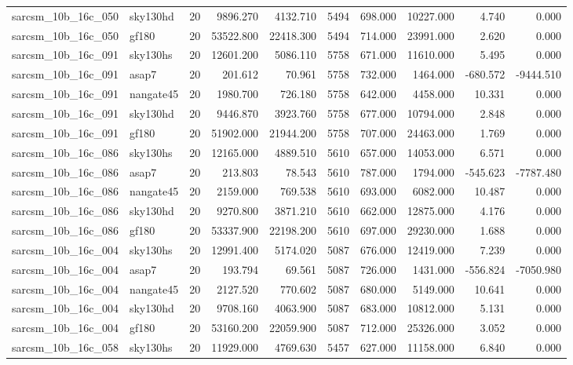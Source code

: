 \documentclass{article}
\begin{document}
\begin{longtable}{llrrrrrrrr}
sarcsm\_10b\_16c\_050 & sky130hd & 20 & 9896.270 & 4132.710 & 5494 & 698.000 & 10227.000 & 4.740 & 0.000 \\
sarcsm\_10b\_16c\_050 & gf180 & 20 & 53522.800 & 22418.300 & 5494 & 714.000 & 23991.000 & 2.620 & 0.000 \\
sarcsm\_10b\_16c\_091 & sky130hs & 20 & 12601.200 & 5086.110 & 5758 & 671.000 & 11610.000 & 5.495 & 0.000 \\
sarcsm\_10b\_16c\_091 & asap7 & 20 & 201.612 & 70.961 & 5758 & 732.000 & 1464.000 & -680.572 & -9444.510 \\
sarcsm\_10b\_16c\_091 & nangate45 & 20 & 1980.700 & 726.180 & 5758 & 642.000 & 4458.000 & 10.331 & 0.000 \\
sarcsm\_10b\_16c\_091 & sky130hd & 20 & 9446.870 & 3923.760 & 5758 & 677.000 & 10794.000 & 2.848 & 0.000 \\
sarcsm\_10b\_16c\_091 & gf180 & 20 & 51902.000 & 21944.200 & 5758 & 707.000 & 24463.000 & 1.769 & 0.000 \\
sarcsm\_10b\_16c\_086 & sky130hs & 20 & 12165.000 & 4889.510 & 5610 & 657.000 & 14053.000 & 6.571 & 0.000 \\
sarcsm\_10b\_16c\_086 & asap7 & 20 & 213.803 & 78.543 & 5610 & 787.000 & 1794.000 & -545.623 & -7787.480 \\
sarcsm\_10b\_16c\_086 & nangate45 & 20 & 2159.000 & 769.538 & 5610 & 693.000 & 6082.000 & 10.487 & 0.000 \\
sarcsm\_10b\_16c\_086 & sky130hd & 20 & 9270.800 & 3871.210 & 5610 & 662.000 & 12875.000 & 4.176 & 0.000 \\
sarcsm\_10b\_16c\_086 & gf180 & 20 & 53337.900 & 22198.200 & 5610 & 697.000 & 29230.000 & 1.688 & 0.000 \\
sarcsm\_10b\_16c\_004 & sky130hs & 20 & 12991.400 & 5174.020 & 5087 & 676.000 & 12419.000 & 7.239 & 0.000 \\
sarcsm\_10b\_16c\_004 & asap7 & 20 & 193.794 & 69.561 & 5087 & 726.000 & 1431.000 & -556.824 & -7050.980 \\
sarcsm\_10b\_16c\_004 & nangate45 & 20 & 2127.520 & 770.602 & 5087 & 680.000 & 5149.000 & 10.641 & 0.000 \\
sarcsm\_10b\_16c\_004 & sky130hd & 20 & 9708.160 & 4063.900 & 5087 & 683.000 & 10812.000 & 5.131 & 0.000 \\
sarcsm\_10b\_16c\_004 & gf180 & 20 & 53160.200 & 22059.900 & 5087 & 712.000 & 25326.000 & 3.052 & 0.000 \\
sarcsm\_10b\_16c\_058 & sky130hs & 20 & 11929.000 & 4769.630 & 5457 & 627.000 & 11158.000 & 6.840 & 0.000 \\

\end{longtable}
\end{document}
